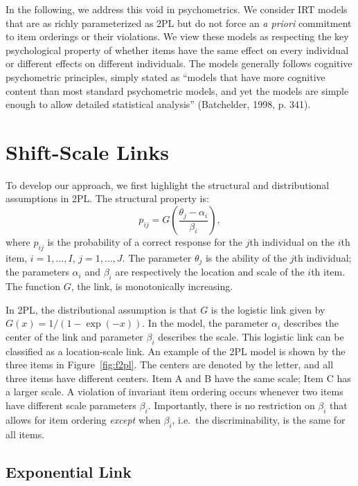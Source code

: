 \documentclass[english,,man]{apa6}
\begin{document}
In the following, we address this void in psychometrics. We consider IRT models that are as richly parameterized as 2PL but do not force an \emph{a priori} commitment to item orderings or their violations. We view these models as respecting the key psychological property of whether items have the same effect on every individual or different effects on different individuals. The models generally follows cognitive psychometric principles, simply stated as \enquote{models that have more cognitive content than most standard psychometric models, and yet the models are simple enough to allow detailed statistical analysis} (Batchelder, 1998, p. 341).

\hypertarget{shift-scale-links}{%
\section{Shift-Scale Links}\label{shift-scale-links}}

To develop our approach, we first highlight the structural and distributional assumptions in 2PL. The structural property is:\\
\[
p_{ij} = G\left(\frac{\theta_j-\alpha_i}{\beta_i}\right),
\]
where \(p_{ij}\) is the probability of a correct response for the \(j\)th individual on the \(i\)th item, \(i=1,\ldots,I\), \(j=1,\ldots,J\). The parameter \(\theta_j\) is the ability of the \(j\)th individual; the parameters \(\alpha_i\) and \(\beta_i\) are respectively the location and scale of the \(i\)th item. The function \(G\), the link, is monotonically increasing.

In 2PL, the distributional assumption is that \(G\) is the logistic link given by \(G(x)=1/(1-\exp(-x))\). In the model, the parameter \(\alpha_i\) describes the center of the link and parameter \(\beta_i\) describes the scale. This logistic link can be classified as a location-scale link. An example of the 2PL model is shown by the three items in Figure~\ref{fig:f2pl}. The centers are denoted by the letter, and all three items have different centers. Item A and B have the same scale; Item C has a larger scale. A violation of invariant item ordering occurs whenever two items have different scale parameters \(\beta_i\). Importantly, there is no restriction on \(\beta_i\) that allows for item ordering \emph{except} when \(\beta_i\), i.e.~the discriminability, is the same for all items.

\hypertarget{exponential-link}{%
\subsection{Exponential Link}\label{exponential-link}}
\end{document}
